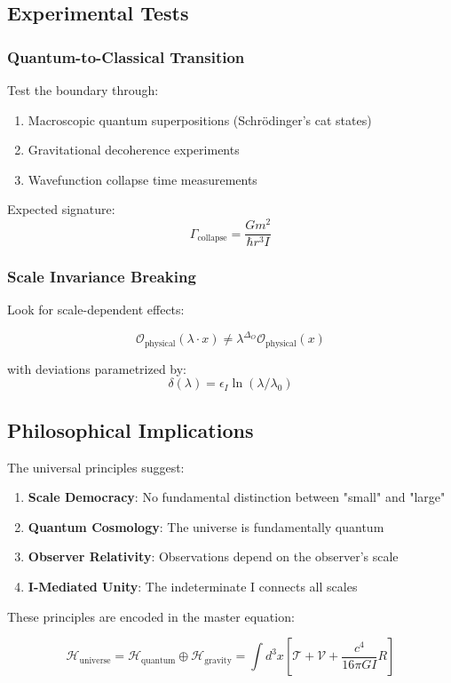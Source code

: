 \subsection{Experimental Tests}

\subsubsection{Quantum-to-Classical Transition}

Test the boundary through:

\begin{enumerate}
    \item Macroscopic quantum superpositions (Schrödinger's cat states)
    \item Gravitational decoherence experiments
    \item Wavefunction collapse time measurements
\end{enumerate}

Expected signature:
\begin{equation}
\label{eq:collapse_rate}
\Gamma_{\text{collapse}} = \frac{Gm^2}{\hbar r^3 I}
\end{equation}

\subsubsection{Scale Invariance Breaking}

Look for scale-dependent effects:

\begin{equation}
\label{eq:scale_breaking}
\mathcal{O}_{\text{physical}}(\lambda \cdot x) \neq \lambda^{\Delta_O} \mathcal{O}_{\text{physical}}(x)
\end{equation}

with deviations parametrized by:
\begin{equation}
\label{eq:scale_deviation}
\delta(\lambda) = \epsilon_I \ln(\lambda/\lambda_0)
\end{equation}

\subsection{Philosophical Implications}

The universal principles suggest:

\begin{enumerate}
    \item \textbf{Scale Democracy}: No fundamental distinction between "small" and "large"
    \item \textbf{Quantum Cosmology}: The universe is fundamentally quantum
    \item \textbf{Observer Relativity}: Observations depend on the observer's scale
    \item \textbf{I-Mediated Unity}: The indeterminate I connects all scales
\end{enumerate}

These principles are encoded in the master equation:

\begin{equation}
\label{eq:master_equation}
\boxed{\mathcal{H}_{\text{universe}} = \mathcal{H}_{\text{quantum}} \oplus \mathcal{H}_{\text{gravity}} = \int d^3x \left[\mathcal{T} + \mathcal{V} + \frac{c^4}{16\pi GI}R\right]}
\end{equation}
